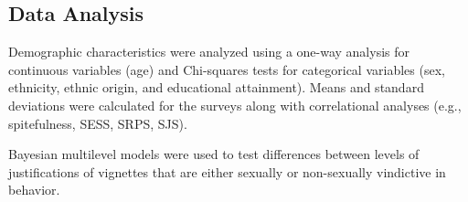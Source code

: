 \documentclass[
  donotrepeattitle,doc, 12pt, a4paper,floatsintext]{apa7}
\begin{document}
\hypertarget{data-analysis}{%
\subsection{Data Analysis}\label{data-analysis}}

Demographic characteristics were analyzed using a one-way analysis for continuous variables (age) and Chi-squares tests for categorical variables (sex, ethnicity, ethnic origin, and educational attainment). Means and standard deviations were calculated for the surveys along with correlational analyses (e.g., spitefulness, SESS, SRPS, SJS).

Bayesian multilevel models were used to test differences between levels of justifications of vignettes that are either sexually or non-sexually vindictive in behavior.
\end{document}

